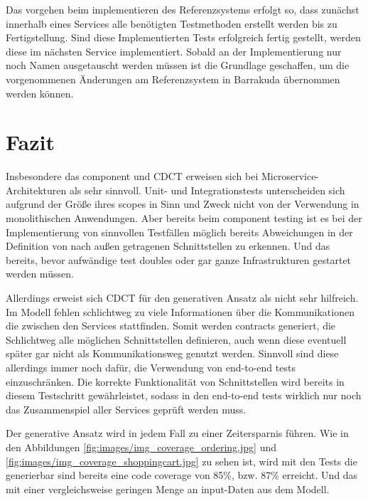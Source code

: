 \documentclass[12pt,a4paper,bibliography=totocnumbered,listof=totocnumbered]{scrartcl}
\begin{document}
Das vorgehen beim implementieren des Referenzsystems erfolgt so, dass zunächst innerhalb eines Services alle benötigten Testmethoden erstellt werden bis zu Fertigstellung. Sind diese Implementierten Tests erfolgreich fertig gestellt, werden diese im nächsten Service implementiert. Sobald an der Implementierung nur noch Namen ausgetauscht werden müssen ist die Grundlage geschaffen, um die vorgenommenen Änderungen am Referenzsystem in Barrakuda übernommen werden können.

\section{Fazit}\label{ch:fazit}

Insbesondere das component und \acf{CDCT} erweisen sich bei Microservice-Architekturen als sehr sinnvoll. Unit- und Integrationstests unterscheiden sich aufgrund der Größe ihres scopes in Sinn und Zweck nicht von der Verwendung in monolithischen Anwendungen. Aber bereits beim component testing ist es bei der Implementierung von sinnvollen Testfällen möglich bereits Abweichungen in der Definition von nach außen getragenen Schnittstellen zu erkennen. Und das bereits, bevor aufwändige test doubles oder gar ganze Infrastrukturen gestartet werden müssen.

Allerdings erweist sich \ac{CDCT} für den generativen Ansatz als nicht sehr hilfreich. Im Modell fehlen schlichtweg zu viele Informationen über die Kommunikationen die zwischen den Services stattfinden. Somit werden contracts generiert, die Schlichtweg alle möglichen Schnittstellen definieren, auch wenn diese eventuell später gar nicht als Kommunikationsweg genutzt werden. Sinnvoll sind diese allerdings immer noch dafür, die Verwendung von end-to-end tests einzuschränken. Die korrekte Funktionalität von Schnittstellen wird bereits in diesem Testschritt gewährleistet, sodass in den end-to-end tests wirklich nur noch das Zusammenspiel aller Services geprüft werden muss.

Der generative Ansatz wird in jedem Fall zu einer Zeitersparnis führen. Wie in den Abbildungen \ref{fig:images/img_coverage_ordering.jpg} und \ref{fig:images/img_coverage_shoppingcart.jpg} zu sehen ist, wird mit den Tests die generierbar sind bereits eine code coverage von 85\%, bzw. 87\% erreicht. Und das mit einer vergleichsweise geringen Menge an input-Daten aus dem Modell.
\end{document}
